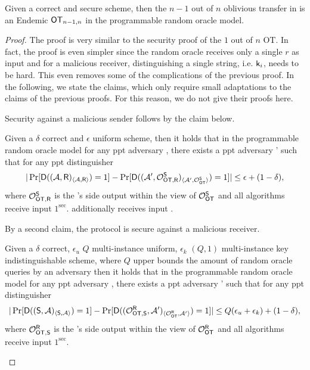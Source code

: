 \begin{lemma}\label{lem:allbutone}
Given a correct and secure \UKA scheme, then the $n-1$ out of $n$ oblivious transfer in   is an Endemic $\mathsf{OT}_{n-1,n}$ in the programmable random oracle model. 
\end{lemma}

\begin{proof}
The proof is very similar to the security proof of the $1$ out of $n$ OT. In fact, the proof is even simpler since the random oracle receives only a single $r$ as input and for a malicious receiver, distinguishing a single string, i.e. $\mathsf{k}_{i}$, needs to be hard. This even removes some of the complications of the previous proof. In the following, we state the claims, which only require small adaptations to the claims of the previous proofs. For this reason, we do not give their proofs here. 

Security against a malicious sender follows by the claim below. 
\begin{claim}\label{claim:malsender}
Given a $\delta$ correct and $\epsilon$ uniform \UKA scheme, then it holds that in the programmable random oracle model for any ppt adversary \Adv, there exists a ppt adversary \Adv' such that for any ppt distinguisher \D
$$
|\Pr[\mathsf D((\mathcal{A},\mathsf{R})_{\langle \mathcal{A}, \mathsf{R}\rangle})=1] -\Pr[\mathsf D( (\mathcal{A}', \mathcal{O}_{\mathsf{OT}, \mathsf{R}}^\mathsf{S})_{\langle \mathcal{A}', \mathcal{O}_{\mathsf{OT}}^\mathsf{S}\rangle})=1]|\leq \epsilon+(1-\delta),
$$
where $\mathcal{O}_{\mathsf{OT}, \mathsf{R}}^\mathsf{S}$ is the \rec's side output within the view of $\mathcal{O}_{\mathsf{OT}}^\mathsf{S}$ and all algorithms receive input $1^\sec$. \rec additionally receives input \set.
\end{claim}


By a second claim, the protocol is secure against a malicious receiver.
\begin{claim}\label{claim:malreceiver}
Given a $\delta$ correct, $\epsilon_u$ $Q$ multi-instance uniform, $\epsilon_k$ $(Q,1)$ multi-instance key indistinguishable  \UKA scheme, where $Q$ upper bounds the amount of random oracle queries by an adversary then it holds that in the programmable random oracle model for any ppt adversary \Adv, there exists a ppt adversary \Adv' such that for any ppt distinguisher \D
$$
|\Pr[\mathsf D((\mathsf{S}, \mathcal{A})_{\langle \mathsf{S}, \mathcal{A}\rangle})=1] -\Pr[\mathsf D((\mathcal{O}_{\mathsf{OT},\mathsf{S}}^\mathsf{R},\mathcal{A}')_{\langle \mathcal{O}_{\mathsf{OT}}^\mathsf{R} , \mathcal{A}' \rangle})=1]|\leq Q(\epsilon_{u}+\epsilon_{k})+(1-\delta),
$$
where $\mathcal{O}_{\mathsf{OT},\mathsf{S}}^\mathsf{R}$ is  the \send's side output within the view of $\mathcal{O}_{\mathsf{OT}}^\mathsf{R}$ and all algorithms receive input $1^\sec$.
\end{claim}

\end{proof}

